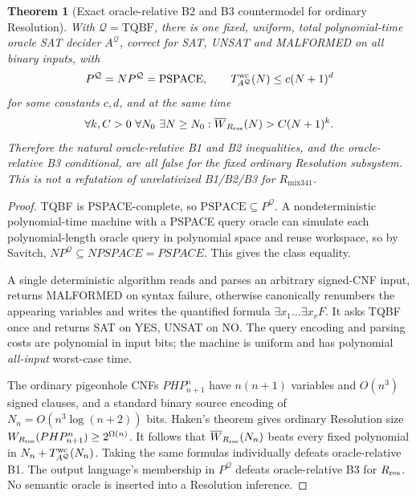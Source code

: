 \documentclass[11pt]{article}
\newtheorem{theorem}{Theorem}
\begin{document}
\begin{theorem}[Exact oracle-relative B2 and B3 countermodel for ordinary Resolution]
With $\mathcal Q=\mathrm{TQBF}$, there is one fixed, uniform, total polynomial-time oracle SAT decider $A^{\mathcal Q}$, correct for SAT, UNSAT and MALFORMED on all binary inputs, with
\[
P^{\mathcal Q}=NP^{\mathcal Q}=\mathrm{PSPACE},\qquad
T_{A^{\mathcal Q}}^{\rm wc}(N)\le c(N+1)^d
\]
for some constants $c,d$, and at the same time
\[
\forall k,C>0\ \forall N_0\ \exists N\ge N_0:
\overline W_{R_{\rm res}}(N)>C(N+1)^k.
\]
Therefore the natural oracle-relative B1 and B2 inequalities, and the oracle-relative B3 conditional, are all false for the \emph{fixed ordinary Resolution subsystem}. This is not a refutation of unrelativized B1/B2/B3 for $R_{\mathrm{mix341}}$.
\end{theorem}
\begin{proof}
TQBF is PSPACE-complete, so $\mathrm{PSPACE}\subseteq P^{\mathcal Q}$. A nondeterministic polynomial-time machine with a PSPACE query oracle can simulate each polynomial-length oracle query in polynomial space and reuse workspace, so by Savitch,
$NP^{\mathcal Q}\subseteq NPSPACE=PSPACE$. This gives the class equality.

A single deterministic algorithm reads and parses an arbitrary signed-CNF input, returns MALFORMED on syntax failure, otherwise canonically renumbers the appearing variables and writes the quantified formula $\exists x_1\ldots\exists x_v F$. It asks TQBF once and returns SAT on YES, UNSAT on NO. The query encoding and parsing costs are polynomial in input bits; the machine is uniform and has polynomial \emph{all-input} worst-case time.

The ordinary pigeonhole CNFs $PHP_{n+1}^{n}$ have $n(n+1)$ variables and $O(n^3)$ signed clauses, and a standard binary source encoding of $N_n=O(n^3\log(n+2))$ bits. Haken's theorem gives ordinary Resolution size $W_{R_{\rm res}}(PHP_{n+1}^{n})\ge2^{\Omega(n)}$. It follows that $\overline W_{R_{\rm res}}(N_n)$ beats every fixed polynomial in $N_n+T_{A^{\mathcal Q}}^{\rm wc}(N_n)$. Taking the same formulas individually defeats oracle-relative B1. The output language's membership in $P^{\mathcal Q}$ defeats oracle-relative B3 for $R_{\rm res}$. No semantic oracle is inserted into a Resolution inference.
\end{proof}
\end{document}
